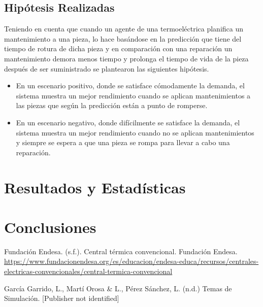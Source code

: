 \documentclass[twocolumn, fontsize=10pt]{article}
\begin{document}
\subsection{Hipótesis Realizadas}

Teniendo en cuenta que cuando un agente de una termoeléctrica planifica un mantenimiento a una pieza, lo hace basándose en la predicción que tiene del
tiempo de rotura de dicha pieza y en comparación con una reparación un mantenimiento demora menos tiempo y prolonga el tiempo de vida de la pieza después
de ser suministrado se plantearon las siguientes hipótesis.

\begin{itemize}
  \item En un escenario positivo, donde se satisface cómodamente la demanda, el sistema muestra un mejor rendimiento cuando se aplican mantenimientos a las piezas que según la predicción están a punto de romperse.
  \item En un escenario negativo, donde difícilmente se satisface la demanda, el sistema muestra un mejor rendimiento cuando no se aplican mantenimientos y siempre se espera a que una pieza se rompa para llevar a cabo una reparación.
\end{itemize}



\section{Resultados y Estadísticas}

\section{Conclusiones}


\renewcommand\refname{Referencias}

\begin{thebibliography}{}

  \sloppypar
   Fundación Endesa. (s.f.). Central térmica convencional. Fundación Endesa. \url{https://www.fundacionendesa.org/es/educacion/endesa-educa/recursos/centrales-electricas-convencionales/central-termica-convencional}


   García Garrido, L., Martí Orosa \& L., Pérez Sánchez, L. (n.d.) Temas de Simulación. [Publisher not identified]

\end{thebibliography}
    
    
\end{document}
